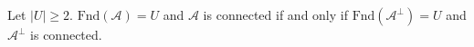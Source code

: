 Let $|U| \geq 2$. $\text{Fnd}(\mathcal{A}) = U$ and $\mathcal{A}$ is connected if and only if $\text{Fnd}(\mathcal{A}^{\perp}) = U$ and $\mathcal{A}^{\perp}$ is connected.
